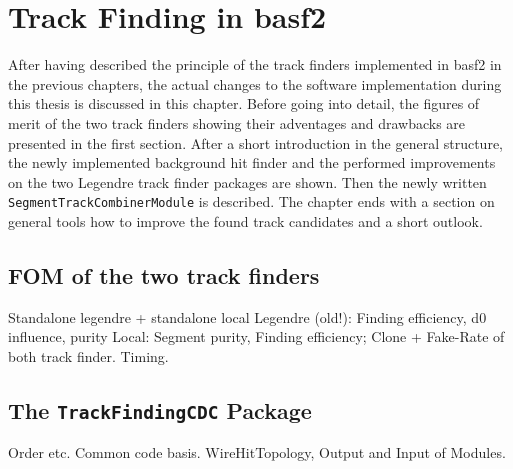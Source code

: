 \chapter{Track Finding in basf2} \label{chapter-workflow}

After having described the principle of the track finders implemented in basf2 in the previous chapters, the actual changes to the software implementation during this thesis is discussed in this chapter. Before going into detail, the figures of merit of the two track finders showing their adventages and drawbacks are presented in the first section. After a short introduction in the general structure, the newly implemented background hit finder and the performed improvements on the two Legendre track finder packages are shown. Then the newly written \texttt{SegmentTrackCombinerModule} is described. The chapter ends with a section on general tools how to improve the found track candidates and a short outlook.

\section{FOM of the two track finders}

Standalone legendre + standalone local
Legendre (old!): Finding efficiency, d0 influence, purity
Local: Segment purity, Finding efficiency; Clone + Fake-Rate of both track finder.
Timing.


\section{The \texttt{TrackFindingCDC} Package}
Order etc. Common code basis. WireHitTopology, Output and Input of Modules.

